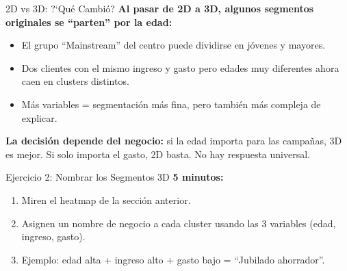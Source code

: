 \documentclass[aspectratio=169, 11pt]{beamer}
\begin{document}
\begin{frame}{2D vs 3D: ?`Qu\'e Cambi\'o?}
  \vspace{-4pt}
  {\footnotesize\color{arcaDark}\bfseries
    Al pasar de 2D a 3D, algunos segmentos originales se ``parten''
    por la edad:}

  \vspace{6pt}
  {\footnotesize
  \begin{itemize}\setlength{\itemsep}{5pt}
    \item[{\color{arcaRed}\scriptsize\faArrowRight}]
      El grupo ``Mainstream'' del centro puede dividirse en
      j\'ovenes y mayores.
    \item[{\color{arcaRed}\scriptsize\faArrowRight}]
      Dos clientes con el mismo ingreso y gasto pero edades
      muy diferentes ahora caen en clusters distintos.
    \item[{\color{codeGreen}\scriptsize\faArrowRight}]
      M\'as variables = segmentaci\'on m\'as fina, pero tambi\'en
      m\'as compleja de explicar.
  \end{itemize}
  }

  \vspace{4pt}
  \begin{tcolorbox}[colback=arcaGray, colframe=arcaRed, boxrule=0.5pt, arc=2pt,
    left=6pt, right=6pt, top=4pt, bottom=4pt]
    {\scriptsize\color{arcaDark}
    \faKey\hspace{4pt}\textbf{La decisi\'on depende del negocio:}
    si la edad importa para las campa\~nas, 3D es mejor.
    Si solo importa el gasto, 2D basta. No hay respuesta universal.}
  \end{tcolorbox}
\end{frame}

\begin{frame}[shrink=5]{Ejercicio 2: Nombrar los Segmentos 3D}
  \vspace{-4pt}
  {\footnotesize\color{arcaDark}\bfseries
    \faClock\hspace{4pt} 5 minutos:}

  \vspace{6pt}
  {\footnotesize
  \begin{enumerate}\setlength{\itemsep}{4pt}
    \item Miren el heatmap de la secci\'on anterior.
    \item Asignen un nombre de negocio a cada cluster usando las
      3 variables (edad, ingreso, gasto).
    \item Ejemplo: edad alta + ingreso alto + gasto bajo =
      ``Jubilado ahorrador''.
  \end{enumerate}
  }
\end{frame}
\end{document}
